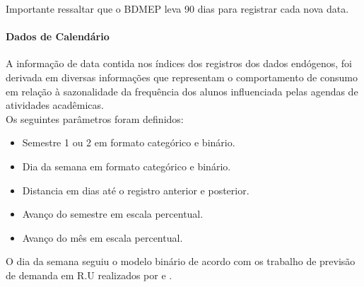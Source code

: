            	Importante ressaltar que o BDMEP leva 90 dias para registrar cada nova data.
            	
        	\paragraph{Dados de Calendário}
            	A informação de data contida nos índices dos registros dos dados endógenos, foi derivada em diversas informações que representam o comportamento de consumo em relação à sazonalidade da frequência dos alunos influenciada pelas agendas de atividades acadêmicas.\\
            	Os seguintes parâmetros foram definidos:
            	\begin{itemize}
            	    \item Semestre 1 ou 2 em formato categórico e binário.
            	    \item Dia da semana em formato categórico e binário.
            	    \item Distancia em dias até o registro anterior e posterior.
            	    \item Avanço do semestre em escala percentual.
            	    \item Avanço do mês em escala percentual.
            	\end{itemize}
            	
            	O dia da semana seguiu o modelo binário de acordo com os trabalho de previsão de demanda em R.U realizados por \cite{Lopes2008} e \cite{Rocha2011}.
        
                \begin{figure}[H]
                \end{figure}
                
